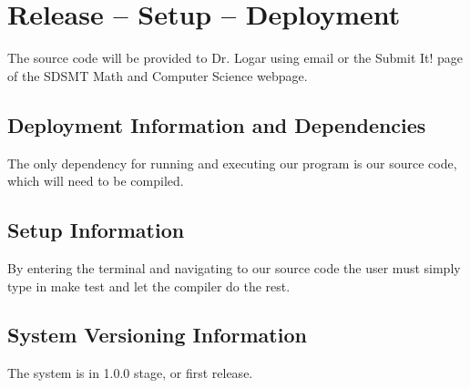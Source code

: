 
\chapter{Release -- Setup -- Deployment}
The source code will be provided to Dr. Logar using email or the Submit It! page of
the SDSMT Math and Computer Science webpage.


\section{Deployment Information and Dependencies}
The only dependency for running and executing our program is our source code, 
which will need to be compiled.



\section{Setup Information}
By entering the terminal and navigating to our source code the user must simply 
type in make test and let the compiler do the rest.



\section{System  Versioning Information}
The system is in 1.0.0 stage, or first release.
